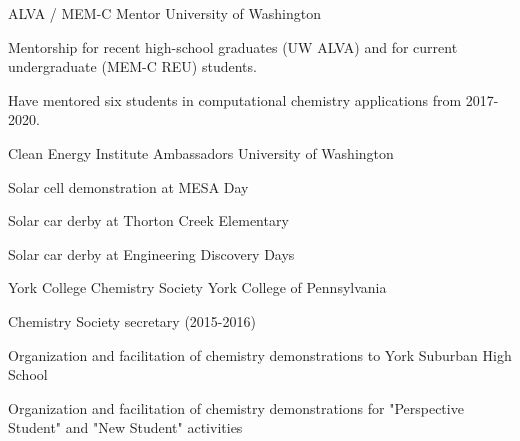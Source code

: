 

\begin{cventries}

\cventry
  {}
  {ALVA / MEM-C Mentor} %
  {University of Washington} %
  {}
  {
    \begin{cvitems}
      \item{Mentorship for recent high-school graduates (UW ALVA) and for current undergraduate (MEM-C REU) students.}
      \item{Have mentored six students in computational chemistry applications from 2017-2020.}
    \end{cvitems}
  }


\cventry
  {}
  {Clean Energy Institute Ambassadors} %
  {University of Washington} %
  {}
  {
    \begin{cvitems}
      \item{Solar cell demonstration at MESA Day}
      \item{Solar car derby at Thorton Creek Elementary}
      \item{Solar car derby at Engineering Discovery Days}
    \end{cvitems}
  }


\cventry
  {}
  {York College Chemistry Society} %
  {York College of Pennsylvania} %
  {}
  {
    \begin{cvitems}
      \item{Chemistry Society secretary (2015-2016)}
      \item{Organization and facilitation of chemistry demonstrations to York Suburban High School}
      \item{Organization and facilitation of chemistry demonstrations for "Perspective Student" and "New Student" activities}
    \end{cvitems}
  }



\end{cventries}
